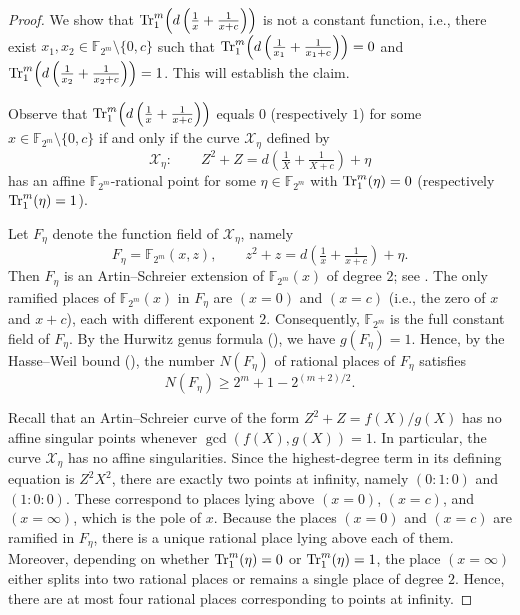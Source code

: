 \documentclass[12pt]{article}
\theoremstyle{plain}
\theoremstyle{definition}
\newcommand{\Tr}{{\rm Tr}}
\begin{document}
	\begin{proof} We show that $\Tr_{1}^{m}\!\left(d\left(\tfrac{1}{x}+\tfrac{1}{x+c}\right)\right) $ is not a constant function, i.e.,
		there exist
		\(x_1,x_2\in \mathbb{F}_{2^m}\setminus\{0,c\}\)
		such that $\Tr_{1}^{m}\!\left(d\left(\tfrac{1}{x_1}+\tfrac{1}{x_1+c}\right)\right)=0$ and $\Tr_{1}^{m}\!\left(d\left(\tfrac{1}{x_2}+\tfrac{1}{x_2+c}\right)\right)=1$.
		This will establish the claim.
		
		\medskip
		
		Observe that $\Tr_{1}^{m}\!\left(d\left(\tfrac{1}{x}+\tfrac{1}{x+c}\right)\right) $ equals $0$ (respectively $1$) for some $x \in \mathbb{F}_{2^m}\setminus \{0,c\}$ if and only if the curve $\mathcal{X}_\eta$ defined by
		\[
		\mathcal{X}_\eta:\qquad
		Z^2+Z=d\left(\tfrac{1}{X}+\tfrac{1}{X+c}\right)+\eta
		\]
		has an affine $\mathbb{F}_{2^m}$-rational point for some $\eta \in \mathbb{F}_{2^m}$ with $\Tr_{1}^{m}(\eta)=0$ (respectively $\Tr_{1}^{m}(\eta)=1$).
		
		\medskip
		Let \(F_\eta\) denote the function field of \(\mathcal{X}_\eta\), namely
		\[
		F_\eta=\mathbb{F}_{2^m}(x,z),\qquad
		z^2+z=d\left(\tfrac{1}{x}+\tfrac{1}{x+c}\right)+\eta.
		\]
		Then \(F_\eta\) is an Artin--Schreier extension of
		\(\mathbb{F}_{2^m}(x)\) of degree \(2\); see \cite[Proposition~3.7.8]{sti}.
		The only ramified places of \(\mathbb{F}_{2^m}(x)\) in \(F_\eta\)
		are \((x=0)\) and \((x=c)\) (i.e., the zero of $x$ and $x+c$), each with different exponent \(2\).
		Consequently, \(\mathbb{F}_{2^m}\) is the full constant field of \(F_\eta\).
		By the Hurwitz genus formula (\cite[Theorem 3.4.13]{sti}), we have \(g(F_\eta)=1\).
		Hence, by the Hasse--Weil bound (\cite[Theorem 5.2.3]{sti}), the number \(N(F_\eta)\) of rational places of
		\(F_\eta\) satisfies
		\begin{equation}\label{eq:place}
			N(F_\eta)\geq 2^m+1-2^{(m+2)/2}.
		\end{equation}    
		
		\medskip
		Recall that an Artin--Schreier curve of the form
		\(Z^2+Z=f(X)/g(X)\) has no affine singular points whenever
		\(\gcd(f(X),g(X))=1\).
		In particular, the curve \(\mathcal{X}_\eta\) has no affine singularities.
		Since the highest-degree term in its defining equation is \(Z^2X^2\),
		there are exactly two points at infinity, namely \((0:1:0)\) and \((1:0:0)\).
		These correspond to places lying above \((x=0)\), \((x=c)\), and \((x=\infty)\), which is the pole of $x$.
		Because the places \((x=0)\) and \((x=c)\) are ramified in \(F_\eta\),
		there is a unique rational place lying above each of them.
		Moreover, depending on whether \(\Tr_{1}^{m}(\eta)=0\) or
		\(\Tr_{1}^{m}(\eta)=1\), the place \((x=\infty)\) either splits into two
		rational places or remains a single place of degree \(2\).
		Hence, there are at most four rational places corresponding to points at infinity.
		

\end{proof}
\end{document}
